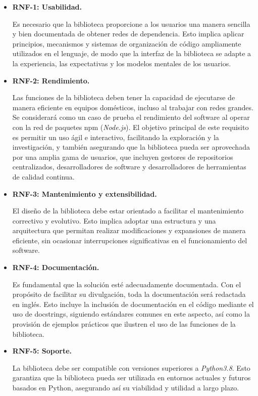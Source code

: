 \begin{itemize}
	\item \textbf{RNF-1: Usabilidad.}

	      Es necesario que la biblioteca proporcione a los usuarios una manera sencilla y
	      bien documentada de obtener redes de dependencia. Esto implica aplicar principios, mecanismos y sistemas de organización
	      de código ampliamente utilizados en el lenguaje, de modo que la interfaz de la biblioteca se adapte a la experiencia,
	      las expectativas y los modelos mentales de los usuarios.

	\item \textbf{RNF-2: Rendimiento.}

	      Las funciones de la biblioteca deben tener la capacidad de ejecutarse de manera eficiente
	      en equipos domésticos, incluso al trabajar con redes grandes. Se considerará como un caso de prueba el rendimiento del software
	      al operar con la red de paquetes npm (\textit{Node.js}). El objetivo principal de este requisito es permitir un uso ágil e interactivo,
	      facilitando la exploración y la investigación, y también asegurando que la biblioteca pueda ser aprovechada por una amplia gama
	      de usuarios, que incluyen gestores de repositorios centralizados, desarrolladores de software y desarrolladores de herramientas
	      de calidad continua.

	\item \textbf{RNF-3: Mantenimiento y extensibilidad.}

	      El diseño de la biblioteca debe estar orientado a facilitar el mantenimiento
	      correctivo y evolutivo. Esto implica adoptar una estructura y una arquitectura que permitan realizar modificaciones y expansiones
	      de manera eficiente, sin ocasionar interrupciones significativas en el funcionamiento del software.

	\item \textbf{RNF-4: Documentación.}

	      Es fundamental que la solución esté adecuadamente documentada. Con el propósito de facilitar
	      su divulgación, toda la documentación será redactada en inglés. Esto incluye la inclusión de documentación en el código mediante
	      el uso de docstrings, siguiendo estándares comunes en este aspecto, así como la provisión de ejemplos prácticos que ilustren el
	      uso de las funciones de la biblioteca.

	\item \textbf{RNF-5: Soporte.}

	      La biblioteca debe ser compatible con versiones superiores a \textit{Python3.8}. Esto garantiza que
	      la biblioteca pueda ser utilizada en entornos actuales y futuros basados en Python, asegurando así su viabilidad y utilidad a
	      largo plazo.
\end{itemize}


